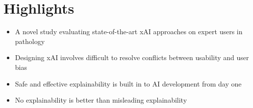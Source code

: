 \section*{\textbf{Highlights}}

\begin{itemize}
    \item A novel study evaluating state-of-the-art xAI approaches on expert users in pathology
    \item Designing xAI involves difficult to resolve conflicts between usability and user bias
    \item Safe and effective explainability is built in to AI development from day one
    \item No explainability is better than misleading explainability
\end{itemize}
